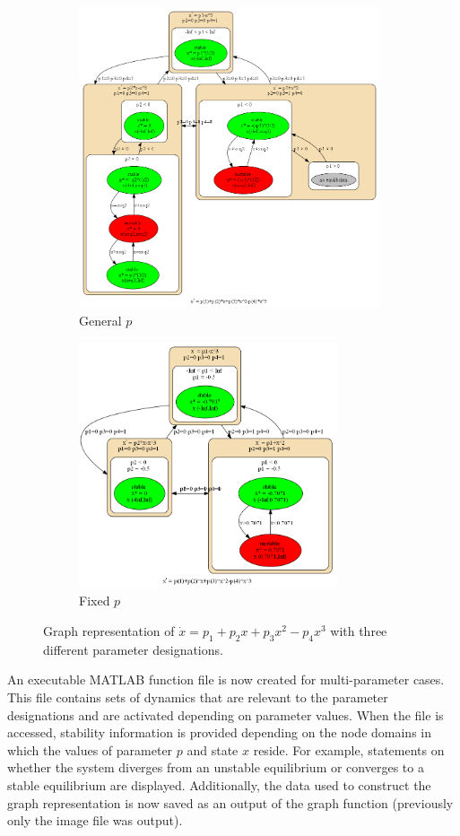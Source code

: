 \documentclass[12pt]{article}
\begin{document}
\begin{figure}[H]
\centering
\begin{subfigure}[b]{0.4\textwidth}
	\centering
	\includegraphics[width=3.5in]{mar31_graph_mpgen.png}
	\caption{General $p$}
\end{subfigure}
\qquad \qquad \qquad
\begin{subfigure}[b]{0.4\textwidth}
	\centering
	\includegraphics[width=3in]{mar31_graph_mpfp.png}
	\caption{Fixed $p$}
\end{subfigure}
\caption{Graph representation of $\dot{x}=p_1+p_2x+p_3x^2-p_4x^3$ with three different parameter designations.}
\label{mar31_graph_mp}
\end{figure}

An executable MATLAB function file is now created for multi-parameter cases. This file contains sets of dynamics that are relevant to the parameter designations and are activated depending on parameter values. When the file is accessed, stability information is provided depending on the node domains in which the values of parameter $p$ and state $x$ reside. For example, statements on whether the system diverges from an unstable equilibrium or converges to a stable equilibrium are displayed. Additionally, the data used to construct the graph representation is now saved as an output of the graph function (previously only the image file was output).
\end{document}
